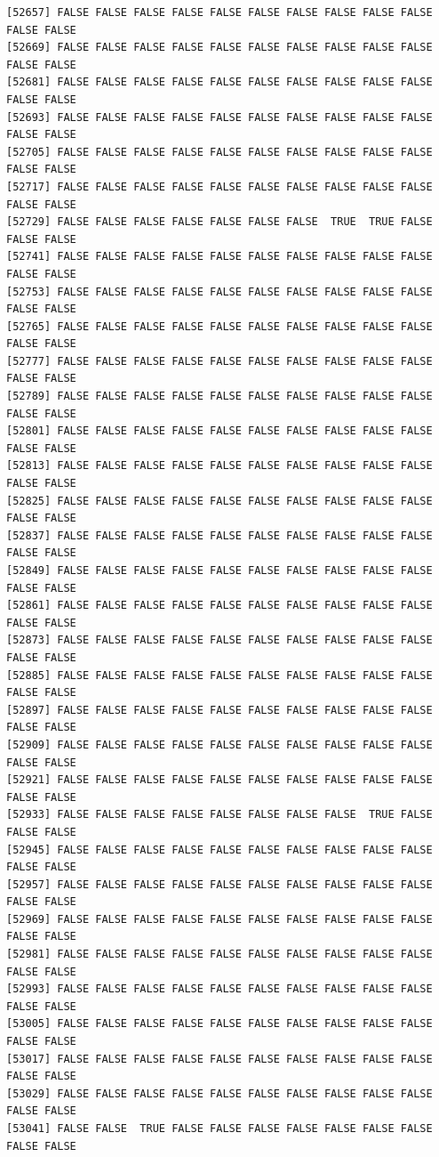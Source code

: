 \documentclass[
  a4paper,
  DIV=11,
  numbers=noendperiod]{scrartcl}
\begin{document}
\begin{verbatim}
[52657] FALSE FALSE FALSE FALSE FALSE FALSE FALSE FALSE FALSE FALSE FALSE FALSE
[52669] FALSE FALSE FALSE FALSE FALSE FALSE FALSE FALSE FALSE FALSE FALSE FALSE
[52681] FALSE FALSE FALSE FALSE FALSE FALSE FALSE FALSE FALSE FALSE FALSE FALSE
[52693] FALSE FALSE FALSE FALSE FALSE FALSE FALSE FALSE FALSE FALSE FALSE FALSE
[52705] FALSE FALSE FALSE FALSE FALSE FALSE FALSE FALSE FALSE FALSE FALSE FALSE
[52717] FALSE FALSE FALSE FALSE FALSE FALSE FALSE FALSE FALSE FALSE FALSE FALSE
[52729] FALSE FALSE FALSE FALSE FALSE FALSE FALSE  TRUE  TRUE FALSE FALSE FALSE
[52741] FALSE FALSE FALSE FALSE FALSE FALSE FALSE FALSE FALSE FALSE FALSE FALSE
[52753] FALSE FALSE FALSE FALSE FALSE FALSE FALSE FALSE FALSE FALSE FALSE FALSE
[52765] FALSE FALSE FALSE FALSE FALSE FALSE FALSE FALSE FALSE FALSE FALSE FALSE
[52777] FALSE FALSE FALSE FALSE FALSE FALSE FALSE FALSE FALSE FALSE FALSE FALSE
[52789] FALSE FALSE FALSE FALSE FALSE FALSE FALSE FALSE FALSE FALSE FALSE FALSE
[52801] FALSE FALSE FALSE FALSE FALSE FALSE FALSE FALSE FALSE FALSE FALSE FALSE
[52813] FALSE FALSE FALSE FALSE FALSE FALSE FALSE FALSE FALSE FALSE FALSE FALSE
[52825] FALSE FALSE FALSE FALSE FALSE FALSE FALSE FALSE FALSE FALSE FALSE FALSE
[52837] FALSE FALSE FALSE FALSE FALSE FALSE FALSE FALSE FALSE FALSE FALSE FALSE
[52849] FALSE FALSE FALSE FALSE FALSE FALSE FALSE FALSE FALSE FALSE FALSE FALSE
[52861] FALSE FALSE FALSE FALSE FALSE FALSE FALSE FALSE FALSE FALSE FALSE FALSE
[52873] FALSE FALSE FALSE FALSE FALSE FALSE FALSE FALSE FALSE FALSE FALSE FALSE
[52885] FALSE FALSE FALSE FALSE FALSE FALSE FALSE FALSE FALSE FALSE FALSE FALSE
[52897] FALSE FALSE FALSE FALSE FALSE FALSE FALSE FALSE FALSE FALSE FALSE FALSE
[52909] FALSE FALSE FALSE FALSE FALSE FALSE FALSE FALSE FALSE FALSE FALSE FALSE
[52921] FALSE FALSE FALSE FALSE FALSE FALSE FALSE FALSE FALSE FALSE FALSE FALSE
[52933] FALSE FALSE FALSE FALSE FALSE FALSE FALSE FALSE  TRUE FALSE FALSE FALSE
[52945] FALSE FALSE FALSE FALSE FALSE FALSE FALSE FALSE FALSE FALSE FALSE FALSE
[52957] FALSE FALSE FALSE FALSE FALSE FALSE FALSE FALSE FALSE FALSE FALSE FALSE
[52969] FALSE FALSE FALSE FALSE FALSE FALSE FALSE FALSE FALSE FALSE FALSE FALSE
[52981] FALSE FALSE FALSE FALSE FALSE FALSE FALSE FALSE FALSE FALSE FALSE FALSE
[52993] FALSE FALSE FALSE FALSE FALSE FALSE FALSE FALSE FALSE FALSE FALSE FALSE
[53005] FALSE FALSE FALSE FALSE FALSE FALSE FALSE FALSE FALSE FALSE FALSE FALSE
[53017] FALSE FALSE FALSE FALSE FALSE FALSE FALSE FALSE FALSE FALSE FALSE FALSE
[53029] FALSE FALSE FALSE FALSE FALSE FALSE FALSE FALSE FALSE FALSE FALSE FALSE
[53041] FALSE FALSE  TRUE FALSE FALSE FALSE FALSE FALSE FALSE FALSE FALSE FALSE

\end{verbatim}
\end{document}
